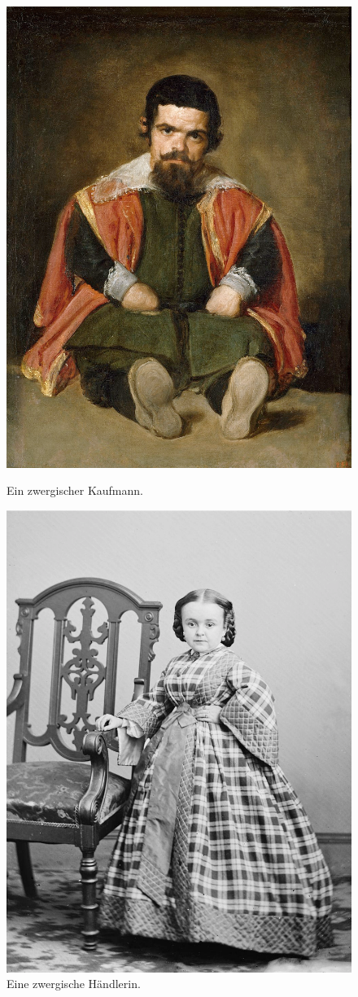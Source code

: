 \begin{figure}
	\begin{minipage}{0.49\textwidth}
		\centering
		\includegraphics[width=0.8\linewidth]{Abbildungen/Weltenbau/Lebensformen/ZwergKaufmann.png}
		\caption{Ein zwergischer Kaufmann.}
		\label{fig:zwergkaufmann}
	\end{minipage}
	\hfill
	\begin{minipage}{0.49\textwidth}
		\centering
		\includegraphics[width=0.8\linewidth]{Abbildungen/Weltenbau/Lebensformen/ZwergHaendlerin.png}
		\caption{Eine zwergische Händlerin.}
		\label{fig:zwerghaendlerin}
	\end{minipage}
\end{figure}



